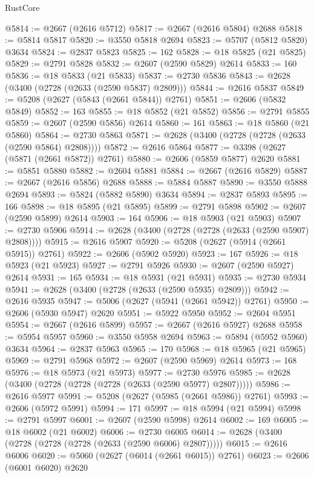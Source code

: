 \begin{lexlean}{RustCore}
\begin{coremodule}
@5814 := @2667 (@2616 @5712)
@5817 := @2667 (@2616 @5804) @2688
@5818 := @5814 @5817
@5820 := @3550 @5818 @2694
@5823 := @5707 (@5812 @5820) @3634
@5824 := @2837 @5823
@5825 := 162
@5828 := @18 @5825 (@21 @5825)
@5829 := @2791 @5828
@5832 := @2607 (@2590 @5829) @2614
@5833 := 160
@5836 := @18 @5833 (@21 @5833)
@5837 := @2730 @5836
@5843 := @2628 (@3400 (@2728 (@2633 (@2590 @5837) @2809)))
@5844 := @2616 @5837
@5849 := @5208 (@2627 (@5843 (@2661 @5844)) @2761)
@5851 := @2606 (@5832 @5849)
@5852 := 163
@5855 := @18 @5852 (@21 @5852)
@5856 := @2791 @5855
@5859 := @2607 (@2590 @5856) @2614
@5860 := 161
@5863 := @18 @5860 (@21 @5860)
@5864 := @2730 @5863
@5871 := @2628 (@3400 (@2728 (@2728 (@2633 (@2590 @5864) @2808))))
@5872 := @2616 @5864
@5877 := @3398 (@2627 (@5871 (@2661 @5872)) @2761)
@5880 := @2606 (@5859 @5877) @2620
@5881 := @5851 @5880
@5882 := @2604 @5881
@5884 := @2667 (@2616 @5829)
@5887 := @2667 (@2616 @5856) @2688
@5888 := @5884 @5887
@5890 := @3550 @5888 @2694
@5893 := @5824 (@5882 @5890) @3634
@5894 := @2837 @5893
@5895 := 166
@5898 := @18 @5895 (@21 @5895)
@5899 := @2791 @5898
@5902 := @2607 (@2590 @5899) @2614
@5903 := 164
@5906 := @18 @5903 (@21 @5903)
@5907 := @2730 @5906
@5914 := @2628 (@3400 (@2728 (@2728 (@2633 (@2590 @5907) @2808))))
@5915 := @2616 @5907
@5920 := @5208 (@2627 (@5914 (@2661 @5915)) @2761)
@5922 := @2606 (@5902 @5920)
@5923 := 167
@5926 := @18 @5923 (@21 @5923)
@5927 := @2791 @5926
@5930 := @2607 (@2590 @5927) @2614
@5931 := 165
@5934 := @18 @5931 (@21 @5931)
@5935 := @2730 @5934
@5941 := @2628 (@3400 (@2728 (@2633 (@2590 @5935) @2809)))
@5942 := @2616 @5935
@5947 := @5006 (@2627 (@5941 (@2661 @5942)) @2761)
@5950 := @2606 (@5930 @5947) @2620
@5951 := @5922 @5950
@5952 := @2604 @5951
@5954 := @2667 (@2616 @5899)
@5957 := @2667 (@2616 @5927) @2688
@5958 := @5954 @5957
@5960 := @3550 @5958 @2694
@5963 := @5894 (@5952 @5960) @3634
@5964 := @2837 @5963
@5965 := 170
@5968 := @18 @5965 (@21 @5965)
@5969 := @2791 @5968
@5972 := @2607 (@2590 @5969) @2614
@5973 := 168
@5976 := @18 @5973 (@21 @5973)
@5977 := @2730 @5976
@5985 := @2628 (@3400 (@2728 (@2728 (@2728 (@2633 (@2590 @5977) @2807)))))
@5986 := @2616 @5977
@5991 := @5208 (@2627 (@5985 (@2661 @5986)) @2761)
@5993 := @2606 (@5972 @5991)
@5994 := 171
@5997 := @18 @5994 (@21 @5994)
@5998 := @2791 @5997
@6001 := @2607 (@2590 @5998) @2614
@6002 := 169
@6005 := @18 @6002 (@21 @6002)
@6006 := @2730 @6005
@6014 := @2628 (@3400 (@2728 (@2728 (@2728 (@2633 (@2590 @6006) @2807)))))
@6015 := @2616 @6006
@6020 := @5060 (@2627 (@6014 (@2661 @6015)) @2761)
@6023 := @2606 (@6001 @6020) @2620

\end{coremodule}
\end{lexlean}

